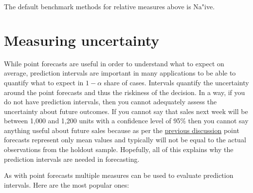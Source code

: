 \documentclass[
]{book}
\theoremstyle{definition}
\theoremstyle{definition}
\theoremstyle{definition}
\theoremstyle{definition}
\theoremstyle{remark}
\begin{document}
The default benchmark methods for relative measures above is Na"ive.

\hypertarget{uncertainty}{%
\section{Measuring uncertainty}\label{uncertainty}}

While point forecasts are useful in order to understand what to expect on average, prediction intervals are important in many applications to be able to quantify what to expect in \(1-\alpha\) share of cases. Intervals quantify the uncertainty around the point forecasts and thus the riskiness of the decision. In a way, if you do not have prediction intervals, then you cannot adequately assess the uncertainty about future outcomes. If you cannot say that sales next week will be between 1,000 and 1,200 units with a confidence level of 95\% then you cannot say anything useful about future sales because as per the \protect\hyperlink{intro}{previous discussion} point forecasts represent only mean values and typically will not be equal to the actual observations from the holdout sample. Hopefully, all of this explains why the prediction intervals are needed in forecasting.

As with point forecasts multiple measures can be used to evaluate prediction intervals. Here are the most popular ones:
\end{document}

